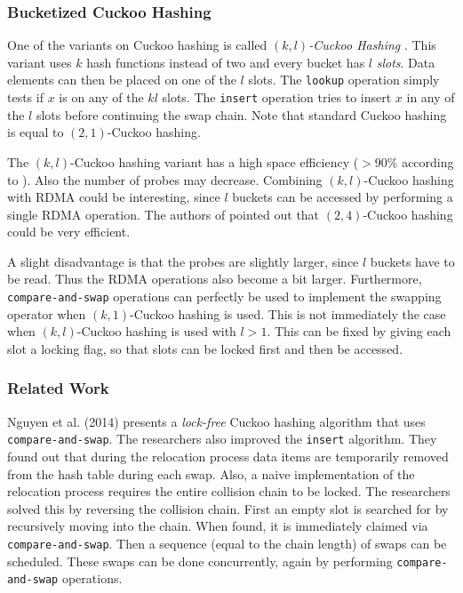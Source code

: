 \subsubsection{Bucketized Cuckoo Hashing}
One of the variants on Cuckoo hashing is called \textit{$(k, l)$-Cuckoo Hashing} \cite{180323}. This variant uses $k$ hash functions instead of two and every bucket has $l$ \emph{slots}. Data elements can then be placed on one of the $l$ slots. The \texttt{lookup} operation simply tests if $x$ is on any of the $kl$ slots. The \texttt{insert} operation tries to insert $x$ in any of the $l$ slots before continuing the swap chain. Note that standard Cuckoo hashing is equal to $(2, 1)$-Cuckoo hashing. 

The $(k, l)$-Cuckoo hashing variant has a high space efficiency ($>90\%$ according to \cite{180323}). Also the number of probes may decrease. Combining $(k, l)$-Cuckoo hashing with RDMA could be interesting, since $l$ buckets can be accessed by performing a single RDMA operation. The authors of \cite{pilaf} pointed out that $(2, 4)$-Cuckoo hashing could be very efficient. 

A slight disadvantage is that the probes are slightly larger, since $l$ buckets have to be read. Thus the RDMA operations also become a bit larger. Furthermore, \texttt{compare-and-swap} operations can perfectly be used to implement the swapping operator when $(k, 1)$-Cuckoo hashing is used. This is not immediately the case when $(k, l)$-Cuckoo hashing is used with $l > 1$. This can be fixed by giving each slot a locking flag, so that slots can be locked first and then be accessed. 

\subsubsection{Related Work}
Nguyen et al. \cite{nguyen2014lock} (2014) presents a \emph{lock-free} Cuckoo hashing algorithm that uses \texttt{compare-and-swap}. The researchers also improved the \texttt{insert} algorithm. They found out that during the relocation process data items are temporarily removed from the hash table during each swap. Also, a naive implementation of the relocation process requires the entire collision chain to be locked. The researchers solved this by reversing the collision chain. First an empty slot is searched for by recursively moving into the chain. When found, it is immediately claimed via \texttt{compare-and-swap}. Then a sequence (equal to the chain length) of swaps can be scheduled. These swaps can be done concurrently, again by performing \texttt{compare-and-swap} operations. 

